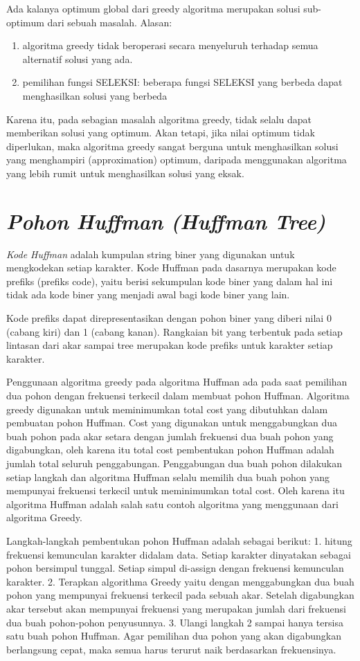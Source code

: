 Ada kalanya optimum global dari greedy algoritma merupakan solusi sub-optimum dari sebuah masalah. Alasan:
\begin{enumerate}
\item algoritma greedy tidak beroperasi secara menyeluruh terhadap semua alternatif solusi yang ada.  
\item	pemilihan fungsi SELEKSI: beberapa fungsi SELEKSI yang berbeda dapat menghasilkan solusi yang berbeda 
\end{enumerate}

Karena itu, pada sebagian masalah algoritma greedy, tidak selalu dapat memberikan solusi yang  optimum. Akan tetapi, jika nilai optimum tidak diperlukan, maka algoritma greedy sangat berguna untuk menghasilkan solusi yang menghampiri (approximation) optimum, daripada menggunakan algoritma yang lebih rumit untuk menghasilkan solusi yang eksak. 

\section{\textit{Pohon Huffman (Huffman Tree)}}

\textit{Kode Huffman} adalah kumpulan string biner yang digunakan untuk mengkodekan setiap karakter. Kode Huffman pada dasarnya merupakan kode prefiks (prefiks code), yaitu berisi sekumpulan kode biner yang dalam hal ini tidak ada kode biner yang menjadi awal bagi kode biner yang lain.

Kode prefiks dapat direpresentasikan dengan pohon biner yang diberi nilai 0 (cabang kiri) dan 1 (cabang kanan). Rangkaian bit yang terbentuk pada setiap lintasan dari akar sampai tree merupakan kode prefiks untuk karakter setiap karakter.

Penggunaan algoritma greedy pada algoritma Huffman ada pada saat pemilihan dua pohon dengan frekuensi terkecil dalam membuat pohon Huffman. Algoritma greedy digunakan untuk meminimumkan total cost yang dibutuhkan dalam pembuatan pohon Huffman. Cost yang digunakan untuk menggabungkan dua buah pohon pada akar setara dengan jumlah frekuensi dua buah pohon yang digabungkan, oleh karena itu total cost pembentukan pohon Huffman adalah jumlah total seluruh penggabungan. Penggabungan dua buah pohon dilakukan setiap langkah dan algoritma Huffman selalu memilih dua buah pohon yang mempunyai frekuensi terkecil untuk meminimumkan total cost. Oleh karena itu algoritma Huffman adalah salah satu contoh algoritma yang menggunaan dari algoritma Greedy.

Langkah-langkah pembentukan pohon Huffman adalah sebagai berikut:
1. hitung frekuensi kemunculan karakter didalam data. Setiap karakter dinyatakan sebagai pohon bersimpul tunggal. Setiap simpul di-assign dengan frekuensi kemunculan karakter.
2. Terapkan algorithma Greedy yaitu dengan menggabungkan dua buah pohon yang mempunyai frekuensi terkecil pada sebuah akar. Setelah digabungkan akar tersebut akan mempunyai frekuensi yang merupakan jumlah dari frekuensi dua buah pohon-pohon penyusunnya.
3. Ulangi langkah 2 sampai hanya tersisa satu buah pohon Huffman. Agar pemilihan dua pohon yang akan digabungkan berlangsung cepat, maka semua harus terurut naik berdasarkan frekuensinya.

